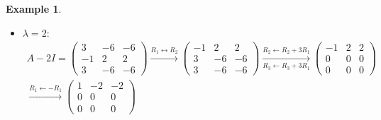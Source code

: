\documentclass[12pt]{article}
\DeclareMathOperator{\rank}{rank}
\theoremstyle{definition}
\newtheorem{example}[theorem]{Example}
\begin{document}
\begin{example}
\begin{itemize}
\[\begin{gathered}
\xrightarrow{R_1\leftrightarrow R_2}
\begin{pmatrix}-1&3&2\\4&-6&-6\\3&-6&-5\end{pmatrix}
\xrightarrow[R_3\leftarrow R_3+3R_1]{R_2\leftarrow R_2+4R_1}
\begin{pmatrix}-1&3&2\\0&6&2\\0&3&1\end{pmatrix}
\\
\xrightarrow{R_2\leftrightarrow R_3}
\begin{pmatrix}-1&3&2\\0&3&1\\0&6&2\end{pmatrix}
\xrightarrow{R_3\leftarrow R_3-2R_2}
\begin{pmatrix}-1&3&2\\0&3&1\\0&0&0\end{pmatrix}
\end{gathered}
\]
So \(\rank(A-I)=2\) (Definition~\ref{def:r4-rank}) and \(g_A(1)=1\) (Definition~\ref{r7-def-multiplicity}). The
equations \(-x_1+3x_2+2x_3=0\),
\(3x_2+x_3=0\) with \(x_3=3\) give \(x_2=-1\) and \(x_1=3\): \(\alpha_1=(3,-1,3)'\) is a basis of \(\mathcal N(A-I)\)
(Theorem~\ref{thm:r4-counting}(d)).
\item \(\lambda=2\):
\[
\begin{gathered}
A-2I=\begin{pmatrix}3&-6&-6\\-1&2&2\\3&-6&-6\end{pmatrix}
\xrightarrow{R_1\leftrightarrow R_2}
\begin{pmatrix}-1&2&2\\3&-6&-6\\3&-6&-6\end{pmatrix}
\xrightarrow[R_3\leftarrow R_3+3R_1]{R_2\leftarrow R_2+3R_1}
\begin{pmatrix}-1&2&2\\0&0&0\\0&0&0\end{pmatrix}
\\
\xrightarrow{R_1\leftarrow-R_1}
\begin{pmatrix}1&-2&-2\\0&0&0\\0&0&0\end{pmatrix}
\end{gathered}
\]
\end{itemize}
\end{example}
\end{document}
